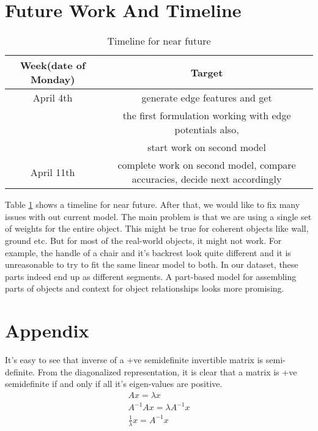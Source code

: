\documentclass[11pt]{article} %
\begin{document}
 \section{Future Work And Timeline}
 \begin{table}[!h]
\label{tab:Timeline}
\begin{center}
\begin{tabular}{|c|c|} \hline
Week(date of Monday) & Target  \\ 
\hline
April 4th & generate edge features and get\\
& the first formulation working with edge potentials also,\\ 
& start work on second model\\ 
\hline
April 11th & complete work on second model, compare accuracies, decide next accordingly\\ 
\hline

\end{tabular}
\caption{Timeline for near future}
\end{center} 
\end{table}
Table \ref{tab:Timeline} shows a timeline for near future. After that, we would like to fix many issues with out current model. The 
main problem is that we are using a single set of weights for the entire object.
This might be true for coherent objects like wall, ground etc. But for most of the real-world objects, it might not work. For example, the handle of a chair and it's backrest look quite different and it is unreasonable to try to fit the same linear model to both. In our dataset, these parts indeed end up as different segments.
 A part-based model for assembling parts of objects and context for object relationships looks more promising.

\section*{Appendix}
It's easy to see that inverse of a +ve semidefinite invertible matrix is semi-definite.
From the diagonalized representation, it is clear that a matrix is +ve semidefinite if and only if all it's eigen-values are positive.
\begin{eqnarray*}
Ax=\lambda x\\
A^{-1}Ax=\lambda A^{-1}x\\
\frac{1}{\lambda}x=A^{-1}x
\end{eqnarray*}
 \small

 

\end{document}
